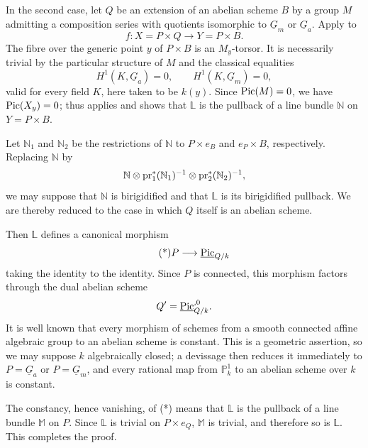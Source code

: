 In the second case, let $Q$ be an extension of an abelian scheme $B$
by a group $M$ admitting a composition series with quotients
isomorphic to $\underline G_m$ or $\underline G_a$.  Apply  to
\[
 f:X=P\times Q\longrightarrow Y=P\times B.
\]
The fibre over the generic point $y$ of $P\times B$ is an
$M_y$-torsor.  It is necessarily trivial by the particular structure
of $M$ and the classical equalities
\[
 H^1(K,\underline G_a)=0,
 \qquad
 H^1(K,\underline G_m)=0,
\]
valid for every field $K$, here taken to be $k(y)$.  Since
$\operatorname{Pic}(M)=0$, we have $\operatorname{Pic}(X_y)=0$; thus  applies and shows that
$\mathbb L$ is the pullback of a line bundle $\mathbb N$ on
$Y=P\times B$.

Let $\mathbb N_1$ and $\mathbb N_2$ be the restrictions of $\mathbb
N$ to $P\times e_B$ and $e_P\times B$, respectively.  Replacing
$\mathbb N$ by
\[
 \mathbb N\otimes\operatorname{pr}_1^*(\mathbb N_1)^{-1}
 \otimes\operatorname{pr}_2^*(\mathbb N_2)^{-1},
\]
we may suppose that $\mathbb N$ is birigidified and that $\mathbb L$
is its birigidified pullback.  We are thereby reduced to the case in
which $Q$ itself is an abelian scheme.

Then $\mathbb L$ defines a canonical morphism
\begin{equation}\tag{*}
 P\longrightarrow\underline{\Pic}_{Q/k}
\end{equation}
taking the identity to the identity.  Since $P$ is connected, this
morphism factors through the dual abelian scheme
\[
 Q'=\underline{\Pic}^{,0}_{Q/k}.
\]
It is well known that every morphism of schemes from a smooth
connected affine algebraic group to an abelian scheme is constant.
This is a geometric assertion, so we may suppose $k$ algebraically
closed; a devissage then reduces it immediately to $P=\underline
G_a$ or $P=\underline G_m$, and every rational map from
$\mathbb P^1_k$ to an abelian scheme over $k$ is constant.

The constancy, hence vanishing, of (*) means that $\mathbb L$ is the
pullback of a line bundle $\mathbb M$ on $P$.  Since $\mathbb L$ is
trivial on $P\times e_Q$, $\mathbb M$ is trivial, and therefore so is
$\mathbb L$.  This completes the proof.

